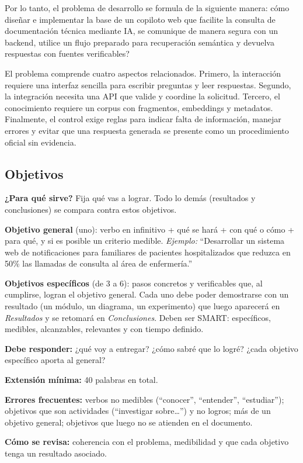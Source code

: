 Por lo tanto, el problema de desarrollo se formula de la siguiente manera: \textquestiondown cómo diseñar e implementar la base de un copiloto web que facilite la consulta de documentación técnica mediante IA, se comunique de manera segura con un backend, utilice un flujo preparado para recuperación semántica y devuelva respuestas con fuentes verificables?

El problema comprende cuatro aspectos relacionados. Primero, la interacción requiere una interfaz sencilla para escribir preguntas y leer respuestas. Segundo, la integración necesita una API que valide y coordine la solicitud. Tercero, el conocimiento requiere un corpus con fragmentos, embeddings y metadatos. Finalmente, el control exige reglas para indicar falta de información, manejar errores y evitar que una respuesta generada se presente como un procedimiento oficial sin evidencia.


\subsection{Objetivos} \label{sec:objetivos} %

\begin{guia}
\textbf{¿Para qué sirve?} Fija qué vas a lograr. Todo lo demás (resultados y conclusiones) se compara contra estos objetivos.

\textbf{Objetivo general} (uno): verbo en infinitivo + qué se hará + con qué o cómo + para qué, y si es posible un criterio
medible. \emph{Ejemplo:} ``Desarrollar un sistema web de notificaciones para familiares de pacientes hospitalizados que
reduzca en 50\% las llamadas de consulta al área de enfermería.''

\textbf{Objetivos específicos} (de 3 a 6): pasos concretos y verificables que, al cumplirse, logran el objetivo general.
Cada uno debe poder demostrarse con un resultado (un módulo, un diagrama, un experimento) que luego aparecerá en
\emph{Resultados} y se retomará en \emph{Conclusiones}. Deben ser SMART: específicos, medibles, alcanzables, relevantes y
con tiempo definido.

\textbf{Debe responder:} ¿qué voy a entregar? ¿cómo sabré que lo logré? ¿cada objetivo específico aporta al general?

\textbf{Extensión mínima:} 40 palabras en total.

\textbf{Errores frecuentes:} verbos no medibles (``conocer'', ``entender'', ``estudiar''); objetivos que son actividades
(``investigar sobre\ldots'') y no logros; más de un objetivo general; objetivos que luego no se atienden en el documento.

\textbf{Cómo se revisa:} coherencia con el problema, medibilidad y que cada objetivo tenga un resultado asociado.
\end{guia}

